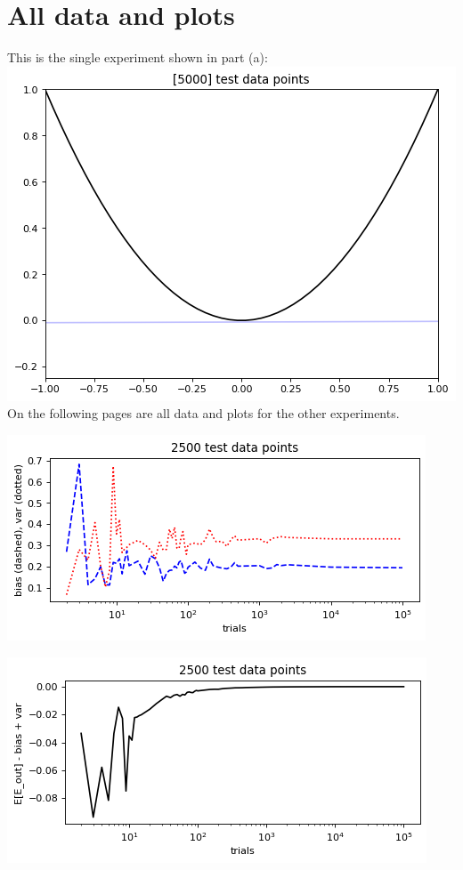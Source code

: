 \documentclass[12pt]{article}
\begin{document}
\section*{All data and plots}
This is the single experiment shown in part (a):
        \includegraphics[width=0.9\linewidth]{png/single_exp_5k_5k.png}
 \\On the following pages are all data and plots for the other experiments.
\pagebreak
{}
\pagebreak
        \begin{center}\includegraphics[width=0.7\linewidth]{png/2500_data_points_bias-var.png}\end{center}
        \begin{center}\includegraphics[width=0.7\linewidth]{png/2500_data_points_diff.png}\end{center}
\end{document}
